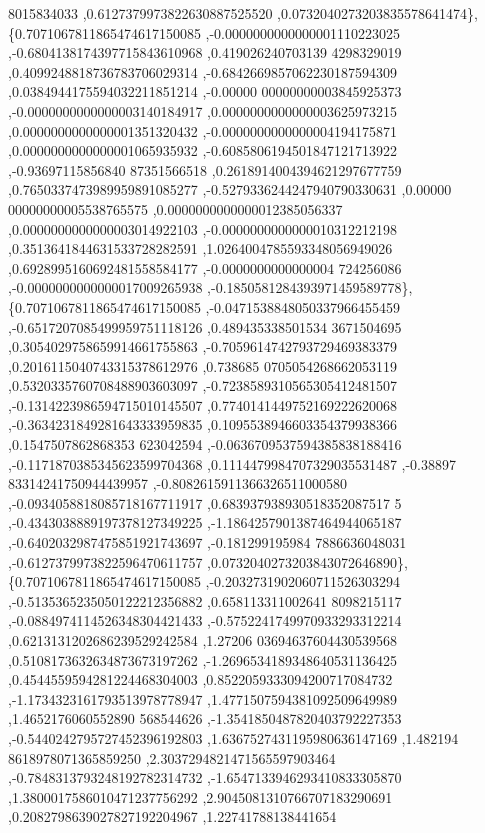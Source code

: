 \begin{DoxyCode}
      8015834033 ,0.6127379973822630887525520 ,0.0732040273203835578641474\},
\{0.7071067811865474617150085 ,-0.0000000000000001110223025 ,-0.6804138174397715843610968 ,0.419026240703139
      4298329019 ,0.4099248818736783706029314 ,-0.6842669857062230187594309 ,0.0384944175594032211851214 ,-0.00000
      00000000003845925373 ,-0.0000000000000003140184917 ,0.0000000000000003625973215 ,0.0000000000000001351320432
       ,-0.0000000000000004194175871 ,0.0000000000000001065935932 ,-0.6085806194501847121713922 ,-0.93697115856840
      87351566518 ,0.2618914004394621297677759 ,0.7650337473989959891085277 ,-0.5279336244247940790330631 ,0.00000
      00000000005538765575 ,0.0000000000000012385056337 ,0.0000000000000003014922103 ,-0.0000000000000010312212198
       ,0.3513641844631533728282591 ,1.0264004785593348056949026 ,0.6928995160692481558584177 ,-0.0000000000000004
      724256086 ,-0.0000000000000017009265938 ,-0.1850581284393971459589778\},
\{0.7071067811865474617150085 ,-0.0471538848050337966455459 ,-0.6517207085499959751118126 ,0.489435338501534
      3671504695 ,0.3054029758659914661755863 ,-0.7059614742793729469383379 ,0.2016115040743315378612976 ,0.738685
      0705054268662053119 ,0.5320335760708488903603097 ,-0.7238589310565305412481507 ,-0.1314223986594715010145507
       ,0.7740141449752169222620068 ,-0.3634231849281643333959835 ,0.1095538946603354379938366 ,0.1547507862868353
      623042594 ,-0.0636709537594385838188416 ,-0.1171870385345623599704368 ,0.1114479984707329035531487 ,-0.38897
      83314241750944439957 ,-0.8082615911366326511000580 ,-0.0934058818085718167711917 ,0.683937938930518352087517
      5 ,-0.4343038889197378127349225 ,-1.1864257901387464944065187 ,-0.6402032987475851921743697 ,-0.181299195984
      7886636048031 ,-0.6127379973822596470611757 ,0.0732040273203843072646890\},
\{0.7071067811865474617150085 ,-0.2032731902060711526303294 ,-0.5135365235050122212356882 ,0.658113311002641
      8098215117 ,-0.0884974114526348304421433 ,-0.5752241749970933293312214 ,0.6213131202686239529242584 ,1.27206
      03694637604430539568 ,0.5108173632634873673197262 ,-1.2696534189348640531136425 ,0.4544559594281224468304003
       ,0.8522059333094200717084732 ,-1.1734323161793513978778947 ,1.4771507594381092509649989 ,1.4652176060552890
      568544626 ,-1.3541850487820403792227353 ,-0.5440242795727452396192803 ,1.6367527431195980636147169 ,1.482194
      8618978071365859250 ,2.3037294821471565597903464 ,-0.7848313793248192782314732 ,-1.6547133946293410833305870
       ,1.3800017586010471237756292 ,2.9045081310766707183290691 ,0.2082798639027827192204967 ,1.22741788138441654

\end{DoxyCode}
